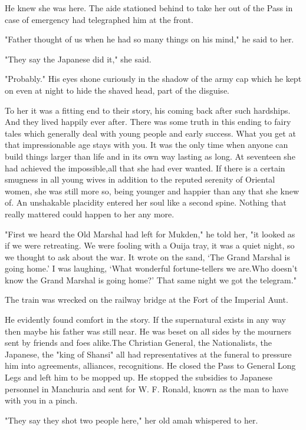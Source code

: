 \par He knew she was here. The aide stationed behind to take her out of the Pass in case of emergency had telegraphed him at the front.
\par "Father thought of us when he had so many things on his mind," he said to her.
\par "They say the Japanese did it," she said.
\par "Probably." His eyes shone curiously in the shadow of the army cap which he kept on even at night to hide the shaved head, part of the disguise.
\par To her it was a fitting end to their story, his coming back after such hardships. And they lived happily ever after. There was some truth in this ending to fairy tales which generally deal with young people and early success. What you get at that impressionable age stays with you. It was the only time when anyone can build things larger than life and in its own way lasting as long. At seventeen she had achieved the impossible,all that she had ever wanted. If there is a certain smugness in all young wives in addition to the reputed serenity of Oriental women, she was still more so, being younger and happier than any that she knew of. An unshakable placidity entered her soul like a second spine. Nothing that really mattered could happen to her any more.
\par "First we heard the Old Marshal had left for Mukden," he told her, "it looked as if we were retreating. We were fooling with a Ouija tray, it was a quiet night, so we thought to ask about the war. It wrote on the sand, ‘The Grand Marshal is going home.' I was laughing, ‘What wonderful fortune-tellers we are.Who doesn't know the Grand Marshal is going home?' That same night we got the telegram."
\par The train was wrecked on the railway bridge at the Fort of the Imperial Aunt.
\par He evidently found comfort in the story. If the supernatural exists in any way then maybe his father was still near. He was beset on all sides by the mourners sent by friends and foes alike.The Christian General, the Nationalists, the Japanese, the "king of Shansi" all had representatives at the funeral to pressure him into agreements, alliances, recognitions. He closed the Pass to General Long Legs and left him to be mopped up. He stopped the subsidies to Japanese personnel in Manchuria and sent for W. F. Ronald, known as the man to have with you in a pinch.
\par "They say they shot two people here," her old amah whispered to her.
